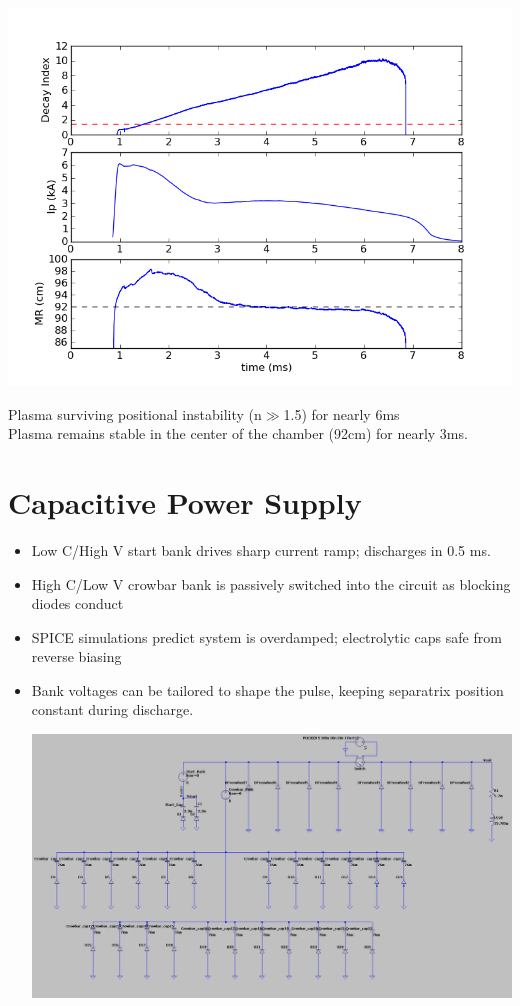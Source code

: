 \documentclass{article}
\begin{document}
\begin{multicols}{5}
\begin{itemize}
\includegraphics[width =0.9\columnwidth]{unstable_plasma}


\begin{center}
Plasma surviving positional instability (n$\gg$1.5) for nearly 6ms\\
Plasma remains stable in the center of the chamber (92cm) for nearly 3ms.\\
\end{center}
\end{itemize}

\section*{Capacitive Power Supply}

\begin{itemize}

\item Low C/High V start bank drives sharp current ramp; discharges in 0.5 ms.
\item High C/Low V crowbar bank is passively switched into the circuit as blocking diodes conduct
\item SPICE simulations predict system is overdamped; electrolytic caps safe from reverse biasing
\item Bank voltages can be tailored to shape the pulse, keeping separatrix position constant during discharge.\\
\begin{center}
\includegraphics[width=.9\columnwidth]{Picture_7}


\end{center}
\end{itemize}
\end{multicols}
\end{document}
